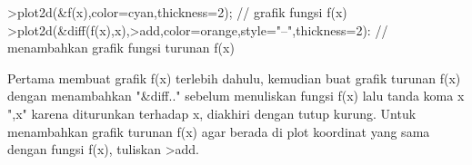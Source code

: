 \documentclass{article}
\begin{document}
\begin{eulernotebook}
\begin{eulercomment}
\begin{eulercomment}
\begin{eulercomment}
\begin{eulercomment}
\begin{euleroutput}
\end{euleroutput}
\begin{eulerprompt}
>plot2d(&f(x),color=cyan,thickness=2); // grafik fungsi f(x)
>plot2d(&diff(f(x),x),>add,color=orange,style="--",thickness=2): // menambahkan grafik fungsi turunan f(x)
\end{eulerprompt}
\begin{eulercomment}
Pertama membuat grafik f(x) terlebih dahulu, kemudian buat grafik
turunan f(x) dengan menambahkan "\&diff.." sebelum menuliskan fungsi
f(x) lalu tanda koma x ",x" karena diturunkan terhadap x, diakhiri
dengan tutup kurung. Untuk menambahkan grafik turunan f(x) agar berada
di plot koordinat yang sama dengan fungsi f(x), tuliskan \textgreater{}add.
\end{eulercomment}
\begin{eulercomment}


\end{eulercomment}
\end{eulercomment}
\end{eulercomment}
\end{eulercomment}
\end{eulercomment}
\end{eulernotebook}
\end{document}
